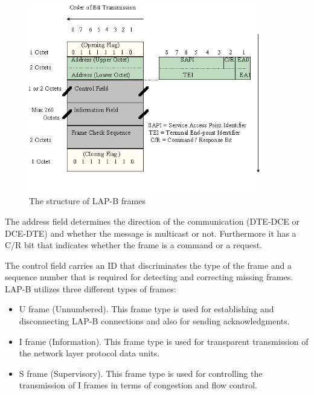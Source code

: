 \documentclass[a4paper]{article}
\begin{document}
\begin{figure}[!htb]
    \centering
    \includegraphics[width=0.9\textwidth]{figures/lapbframe.png}
    \caption{The structure of LAP-B frames}
    \label{fig:lapbframe}
\end{figure}

The address field determines the direction of the communication (DTE-DCE or DCE-DTE) and whether the message is
multicast or not. Furthermore it has a C/R bit that indicates whether the frame is a command or a request.

The control field carries an ID that discriminates the type of the frame and a sequence number that is required for
detecting and correcting missing frames. LAP-B utilizes three different types of frames:
\begin{itemize}
    \item U frame (Unnumbered). This frame type is used for establishing and disconnecting	LAP-B connections and
          also for
          sending acknowledgments.
    \item I frame (Information). This frame type is used for transparent transmission of the network layer protocol
          data
          units.
    \item S frame (Supervisory). This frame type is used for controlling the transmission of I frames in terms of
          congestion and flow control.
\end{itemize}
\end{document}
